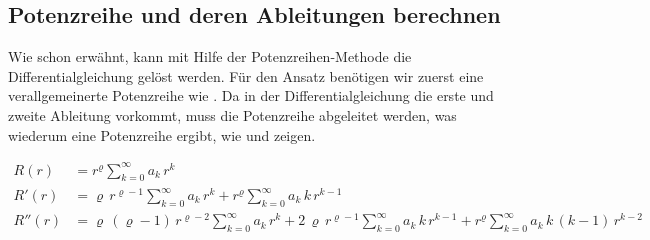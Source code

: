 \subsection[Potenzreihe und deren Ableitungen]{Potenzreihe und deren Ableitungen berechnen}
\begin{normalsize}
Wie schon erw\"ahnt,
kann mit Hilfe der Potenzreihen-Methode die Differentialgleichung  gel\"ost werden.
F\"ur den Ansatz ben\"otigen wir zuerst eine verallgemeinerte Potenzreihe wie .
Da in der Differentialgleichung die erste und zweite Ableitung vorkommt,
muss die Potenzreihe abgeleitet werden,
was wiederum eine Potenzreihe ergibt,
wie  und  zeigen.
\end{normalsize}
\begin{align}
	R \left( r \right)
	&=
	r^{\varrho}
	\sum_{k=0}^{\infty} a_k \, r^k
	\label{eq:bessel:potenzreihe:verallgemeinert}
\\
	R'\left( r \right)
	&=
	\varrho \, r^{\varrho - 1}
	\sum_{k=0}^{\infty} a_k \, r^k
	+
	r^{\varrho}
	\sum_{k=0}^{\infty} a_k \, k \, r^{k - 1}
	\label{eq:bessel:potenzreihe:ersteableitung}
\\
	R'' \left( r \right)
	&=
	\varrho \, \left( \varrho - 1 \right) \, r^{\varrho - 2}
	\sum_{k=0}^{\infty} a_k \, r^k
	+
	2 \, \varrho \, r^{\varrho - 1}
	\sum_{k=0}^{\infty} a_k \, k \, r^{k - 1}
	+
	r^{\varrho}
	\sum_{k=0}^{\infty} a_k \, k \, \left( k - 1 \right) \, r^{k - 2}	
	\label{eq:bessel:potenzreihe:zweiteableitung}
\end{align}
